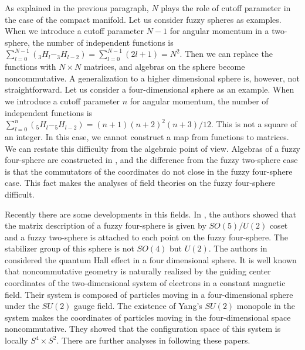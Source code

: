 \documentclass[a4paper,11pt]{article}
\begin{document}
As explained in the previous paragraph, 
$N$ plays the role of cutoff parameter in the case of the compact manifold. 
Let us consider fuzzy spheres as examples. 
When we introduce a cutoff parameter $N-1$ for angular momentum 
in a two-sphere, 
the number of independent functions is 
$\sum_{l=0}^{N-1}(_{3}H_{l}-_{3}H_{l-2})
=\sum_{l=0}^{N-1}(2l+1)=N^{2}$. 
Then we can replace the functions with $N \times N$ matrices, 
and algebras on the sphere become noncommutative.  
A generalization to a higher dimensional sphere is, 
however, not straightforward. 
Let us consider a four-dimensional sphere as an example. 
When we introduce a cutoff parameter $n$ for angular momentum, 
the number of independent functions is 
$\sum_{l=0}^{n}(_{5}H_{l}-_{5}H_{l-2})
=(n+1)(n+2)^{2}(n+3)/12$. 
This is not a square of an integer. 
In this case, we cannot construct a map from functions to matrices. 
We can restate this difficulty from the algebraic point of view. 
Algebras of a fuzzy four-sphere are constructed in \cite{castelino}, 
and the difference from the fuzzy two-sphere case is that 
the commutators of the coordinates do not close 
in the fuzzy four-sphere case. 
This fact makes the analyses of field theories on the fuzzy 
four-sphere difficult. 

Recently there are some developments in this fields. 
In \cite{horamgooram}, the authors showed that 
the matrix description of a fuzzy four-sphere 
is given by $SO(5)/U(2)$ coset 
and a fuzzy two-sphere is attached to each point on 
the fuzzy four-sphere. The stabilizer group of this sphere 
is not $SO(4)$ but $U(2)$. 
The authors in \cite{zhanghu} considered the quantum Hall effect 
in a four dimensional sphere. 
It is well known that 
noncommutative geometry is naturally realized by the guiding 
center coordinates of the two-dimensional system of electrons 
in a constant magnetic field. 
Their system is composed of particles moving in a four-dimensional 
sphere under the $SU(2)$ gauge field. 
The existence of Yang's $SU(2)$ monopole\cite{Yang} 
in the system makes the coordinates of particles 
moving in the four-dimensional space noncommutative. 
They showed that the configuration space of this system is 
locally $S^{4}\times S^{2}$. 
There are further analyses in \cite{fabinger,chenhou,karanair} 
following these papers. 
\end{document}
